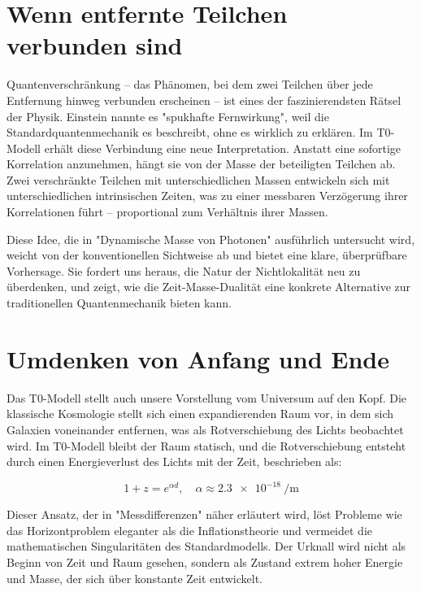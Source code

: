 \documentclass[a4paper,12pt]{article}
\begin{document}
	\section{Wenn entfernte Teilchen verbunden sind}
	
	Quantenverschränkung – das Phänomen, bei dem zwei Teilchen über jede Entfernung hinweg verbunden erscheinen – ist eines der faszinierendsten Rätsel der Physik. Einstein nannte es "spukhafte Fernwirkung", weil die Standardquantenmechanik es beschreibt, ohne es wirklich zu erklären. Im T0-Modell erhält diese Verbindung eine neue Interpretation. Anstatt eine sofortige Korrelation anzunehmen, hängt sie von der Masse der beteiligten Teilchen ab. Zwei verschränkte Teilchen mit unterschiedlichen Massen entwickeln sich mit unterschiedlichen intrinsischen Zeiten, was zu einer messbaren Verzögerung ihrer Korrelationen führt – proportional zum Verhältnis ihrer Massen.
	
	Diese Idee, die in "Dynamische Masse von Photonen" \cite{pascher_photons_2025} ausführlich untersucht wird, weicht von der konventionellen Sichtweise ab und bietet eine klare, überprüfbare Vorhersage. Sie fordert uns heraus, die Natur der Nichtlokalität neu zu überdenken, und zeigt, wie die Zeit-Masse-Dualität eine konkrete Alternative zur traditionellen Quantenmechanik bieten kann.
	
	\section{Umdenken von Anfang und Ende}
	
	Das T0-Modell stellt auch unsere Vorstellung vom Universum auf den Kopf. Die klassische Kosmologie stellt sich einen expandierenden Raum vor, in dem sich Galaxien voneinander entfernen, was als Rotverschiebung des Lichts beobachtet wird. Im T0-Modell bleibt der Raum statisch, und die Rotverschiebung entsteht durch einen Energieverlust des Lichts mit der Zeit, beschrieben als:
	
	\begin{equation}
		1 + z = e^{\alpha d}, \quad \alpha \approx \SI{2.3e-18}{\per\meter}
	\end{equation}
	
	Dieser Ansatz, der in "Messdifferenzen" \cite{pascher_messdifferenzen_2025} näher erläutert wird, löst Probleme wie das Horizontproblem eleganter als die Inflationstheorie und vermeidet die mathematischen Singularitäten des Standardmodells. Der Urknall wird nicht als Beginn von Zeit und Raum gesehen, sondern als Zustand extrem hoher Energie und Masse, der sich über konstante Zeit entwickelt.
	
\end{document}
